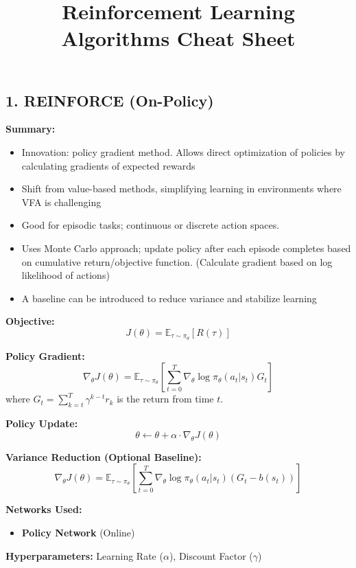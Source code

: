 \documentclass[letterpaper,10pt]{article}
\title{\vspace{-4cm}Reinforcement Learning Algorithms Cheat Sheet}
\author{}
\date{}
\begin{document}
\maketitle
\normalsize
\begin{multicols}{2}

\section*{1. REINFORCE (On-Policy)}
\textbf{Summary:}
\begin{itemize}
    \item Innovation: policy gradient method. Allows direct optimization of policies by calculating gradients of expected rewards
    \item Shift from value-based methods, simplifying learning in environments where VFA is challenging
    \item Good for episodic tasks; continuous or discrete action spaces.
    \item Uses Monte Carlo approach; update policy after each episode completes based on cumulative return/objective function. (Calculate gradient based on log likelihood of actions)
    \item A baseline can be introduced to reduce variance and stabilize learning
\end{itemize}

\noindent \textbf{Objective:}
\[
J(\theta) = \mathbb{E}_{\tau \sim \pi_\theta} \left[ R(\tau) \right]
\]

\noindent \textbf{Policy Gradient:}
\[
\nabla_\theta J(\theta) = \mathbb{E}_{\tau \sim \pi_\theta} \left[ \sum_{t=0}^{T} \nabla_\theta \log \pi_\theta(a_t | s_t) G_t \right]
\]
where \( G_t = \sum_{k=t}^{T} \gamma^{k-t} r_k \) is the return from time \( t \).

\noindent \textbf{Policy Update:}
\[
\theta \leftarrow \theta + \alpha \cdot \nabla_\theta J(\theta)
\]

\noindent \textbf{Variance Reduction (Optional Baseline):}
\[
\nabla_\theta J(\theta) = \mathbb{E}_{\tau \sim \pi_\theta} \left[ \sum_{t=0}^{T} \nabla_\theta \log \pi_\theta(a_t | s_t) \left( G_t - b(s_t) \right) \right]
\]

\noindent \textbf{Networks Used:} 
\begin{itemize}
    \item \textbf{Policy Network} (Online)
\end{itemize}

\noindent \textbf{Hyperparameters: }Learning Rate (\(\alpha\)), Discount Factor (\(\gamma\))


\end{multicols}
\end{document}

